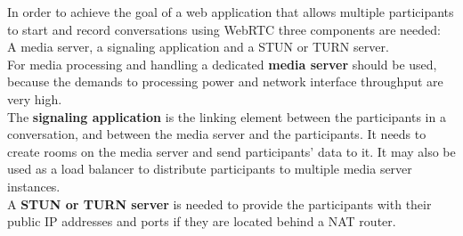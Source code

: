 \documentclass[../../../thesis.tex]{subfiles}
\begin{document}
In order to achieve the goal of a web application that allows multiple participants to start and record conversations using WebRTC three components are needed:\\
A media server, a signaling application and a STUN or TURN server.\\

For media processing and handling a dedicated \textbf{media server} should be used, because the demands to processing power and network interface throughput are very high.\\

The \textbf{signaling application} is the linking element between the participants in a conversation, and between the media server and the participants.
It needs to create rooms on the media server and send participants' data to it. It may also be used as a load balancer to distribute participants to multiple media server instances.\\

A \textbf{STUN or TURN server} is needed to provide the participants with their public IP addresses and ports if they are located behind a NAT router.
\end{document}
